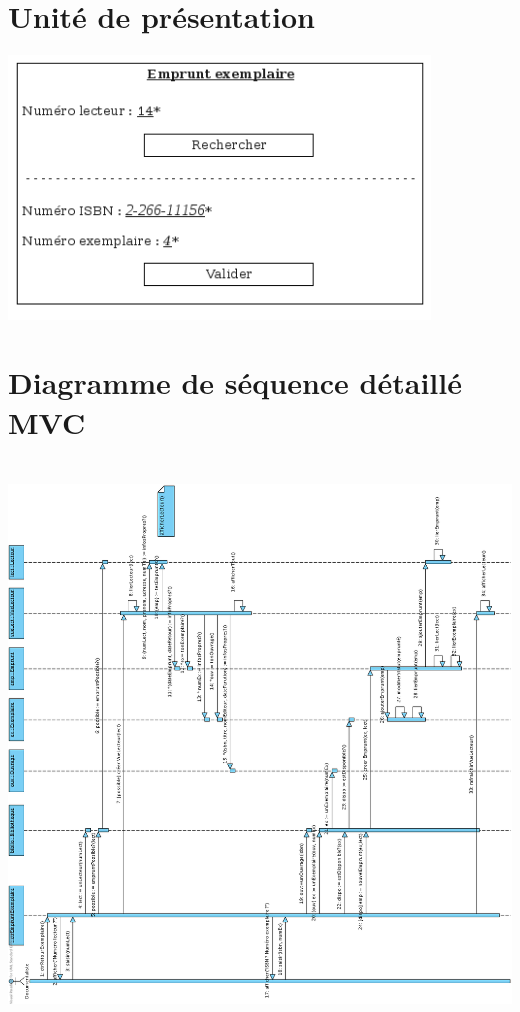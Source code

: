 \documentclass[a4paper,10pt]{report}
\begin{document}
\newpage

\section*{Unité de présentation}
\includegraphics[height=70mm]{UpEmpruntExemplaire.png}

\section*{Diagramme de séquence détaillé MVC}
\includegraphics[height=150mm]{EmpruntExemplaireMVC.png}
\end{document}
